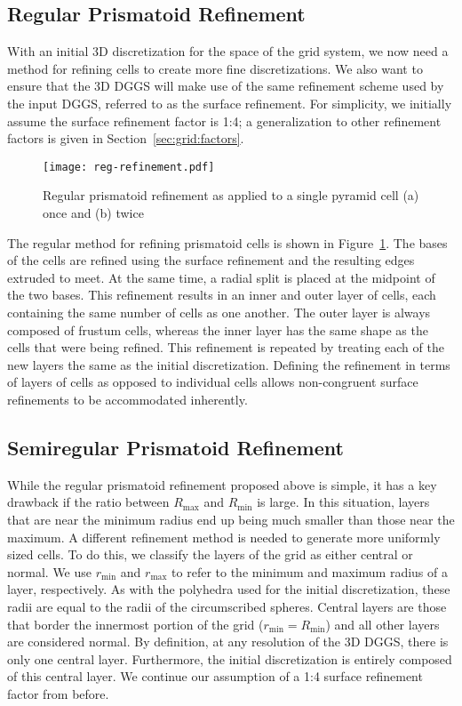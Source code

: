 \subsection{Regular Prismatoid Refinement} \label{chap:5:regular}
With an initial 3D discretization for the space of the grid system, we now need a method for refining cells to create more fine discretizations.
We also want to ensure that the 3D DGGS will make use of the same refinement scheme used by the input DGGS, referred to as the surface refinement.
For simplicity, we initially assume the surface refinement factor is 1:4; a generalization to other refinement factors is given in Section~\ref{sec:grid:factors}.


\begin{figure}[ht!]
	\centering
	\texttt{[image: reg-refinement.pdf]}
	\caption[Regular prismatoid refinement]{
		Regular prismatoid refinement as applied to a single pyramid cell (a) once and (b) twice
	}
	\label{fig:regular}
\end{figure}


The regular method for refining prismatoid cells is shown in Figure~\ref{fig:regular}.
The bases of the cells are refined using the surface refinement and the resulting edges extruded to meet.
At the same time, a radial split is placed at the midpoint of the two bases.
This refinement results in an inner and outer layer of cells, each containing the same number of cells as one another.
The outer layer is always composed of frustum cells, whereas the inner layer has the same shape as the cells that were being refined.
This refinement is repeated by treating each of the new layers the same as the initial discretization.
Defining the refinement in terms of layers of cells as opposed to individual cells allows non-congruent surface refinements to be accommodated inherently.


\subsection{Semiregular Prismatoid Refinement} \label{chap:5:semireg}
While the regular prismatoid refinement proposed above is simple, it has a key drawback if the ratio between $R_\mathrm{max}$ and $R_\mathrm{min}$ is large.
In this situation, layers that are near the minimum radius end up being much smaller than those near the maximum.
A different refinement method is needed to generate more uniformly sized cells.
To do this, we classify the layers of the grid as either central or normal.
We use $r_\mathrm{min}$ and $r_\mathrm{max}$ to refer to the minimum and maximum radius of a layer, respectively.
As with the polyhedra used for the initial discretization, these radii are equal to the radii of the circumscribed spheres.
Central layers are those that border the innermost portion of the grid ($r_\mathrm{min} = R_\mathrm{min}$) and all other layers are considered normal.
By definition, at any resolution of the 3D DGGS, there is only one central layer.
Furthermore, the initial discretization is entirely composed of this central layer.
We continue our assumption of a 1:4 surface refinement factor from before.


